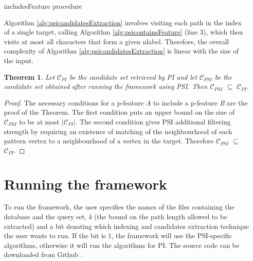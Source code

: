 \documentclass{l4proj}
\newtheorem{theorem}{Theorem}[section]
\newcommand{\fancyC}{\mathcal{C}}
\begin{document}
\begin{algorithm}
\centering
\caption{includesFeature procedure}
\label{alg:psicontainsFeature}
\begin{algorithmic}[1]
  
\EndIf
{} 
\EndIf
{} 
    \EndIf
\EndFor
{}
\EndProcedure
\end{algorithmic}
\end{algorithm}

Algorithm \ref{alg:psicandidatesExtraction} involves visiting each path in the index of a single target, calling Algorithm \ref{alg:psicontainsFeature} (line 3), which then visits at most all characters that form a given nlabel. Therefore, the overall complexity of Algorithm \ref{alg:psicandidatesExtraction} is linear with the size of the input.

\begin{theorem}
\label{psiisbettertheorem}
Let $\fancyC_{PI}$ be the candidate set retrieved by PI and let $\fancyC_{PSI}$ be the candidate set obtained after running the framework using PSI. Then $\fancyC_{PSI}$ $\subseteq$ $\fancyC_{PI}$.
\end{theorem}

\begin{proof}
The necessary conditions for a p-feature \emph{A} to include a p-feature \emph{B} are the proof of the Theorem. The first condition puts an upper bound on the size of $\fancyC_{PSI}$ to be at most $|\fancyC_{PI}|$. The second condition gives PSI additional filtering strength by requiring an existence of matching of the neighbourhood of each pattern vertex to a neighbourhood of a vertex in the target. Therefore $\fancyC_{PSI}$ $\subseteq$ $\fancyC_{PI}$. 
\end{proof}

\section{Running the framework}
To run the framework, the user specifies the names of the files containing the database and the query set, \emph{k} (the bound on the path length allowed to be extracted) and a bit denoting which indexing and candidates extraction technique the user wants to run. If the bit is 1, the framework will use the PSI-specific algorithms, otherwise it will run the algorithms for PI. The source code can be downloaded from Github \cite{framework-github}.
\end{document}
